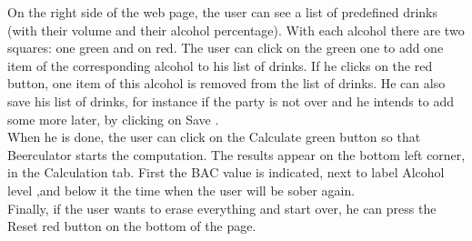 On the right side of the web page, the user can see a list of predefined drinks (with their volume and their alcohol percentage). With each alcohol there are two squares: one green and on red. The user can click on the green one to add one item of the corresponding alcohol to his list of drinks. If he clicks on the red button, one item of this alcohol is removed from the list of drinks. He can also save his list of drinks, for instance if the party is not over and he intends to add some more later, by clicking on \guillemotleft{} Save \guillemotright{}.\\

When he is done, the user can click on the \guillemotleft{} Calculate \guillemotright{} green button so that Beerculator starts the computation. The results appear on the bottom left corner, in the \guillemotleft{} Calculation \guillemotright{} tab. First the BAC value is indicated, next to label \guillemotleft{} Alcohol level \guillemotright{} ,and below it the time when the user will be sober again.\\

Finally, if the user wants to erase everything and start over, he can press the \guillemotleft{} Reset \guillemotright{} red button on the bottom of the page.
